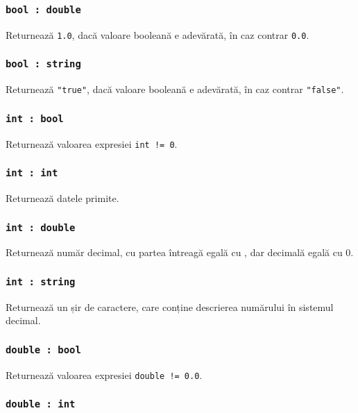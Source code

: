 \subsubsection{\texttt{bool : double}}

Returnează \texttt{1.0}, dacă valoare booleană e adevărată, în caz contrar \texttt{0.0}.

\subsubsection{\texttt{bool : string}}

Returnează \texttt{"true"}, dacă valoare booleană e adevărată, în caz contrar \texttt{"false"}.

\subsubsection{\texttt{int : bool}}

Returnează valoarea expresiei \texttt{int != 0}.

\subsubsection{\texttt{int : int}}

Returnează datele primite.

\subsubsection{\texttt{int : double}}

Returnează număr decimal, cu partea întreagă egală cu  \integer, dar decimală egală cu 0.

\subsubsection{\texttt{int : string}}

Returnează un șir de caractere, care conține descrierea numărului \integer{} în sistemul decimal.

\subsubsection{\texttt{double : bool}}

Returnează valoarea expresiei \texttt{double != 0.0}.

\subsubsection{\texttt{double : int}}


